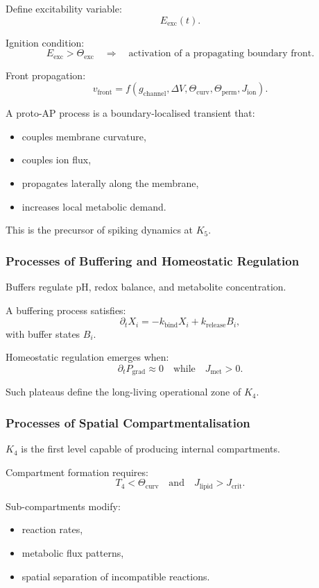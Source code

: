 Define excitability variable:
\[
E_{\text{exc}}(t).
\]

Ignition condition:
\[
E_{\text{exc}} > \Theta_{\text{exc}}
\quad\Rightarrow\quad
\text{activation of a propagating boundary front}.
\]

Front propagation:
\[
v_{\text{front}} = f(g_{\text{channel}}, \Delta V, \Theta_{\text{curv}},
\Theta_{\text{perm}}, J_{\text{ion}}).
\]

A proto-AP process is a boundary-localised transient that:
\begin{itemize}
    \item couples membrane curvature,
    \item couples ion flux,
    \item propagates laterally along the membrane,
    \item increases local metabolic demand.
\end{itemize}

This is the precursor of spiking dynamics at $K_5$.

\subsubsection{Processes of Buffering and Homeostatic Regulation}

Buffers regulate pH, redox balance, and metabolite concentration.

A buffering process satisfies:
\[
\partial_t X_i = -k_{\text{bind}} X_i + k_{\text{release}} B_i,
\]
with buffer states $B_i$.

Homeostatic regulation emerges when:
\[
\partial_t P_\text{grad} \approx 0
\quad\text{while}\quad
J_{\text{met}} > 0.
\]

Such plateaus define the long-living operational zone of $K_4$.

\subsubsection{Processes of Spatial Compartmentalisation}

$K_4$ is the first level capable of producing internal compartments.

Compartment formation requires:
\[
T_4 < \Theta_{\text{curv}} \quad\text{and}\quad
J_{\text{lipid}} > J_{\text{crit}}.
\]

Sub-compartments modify:
\begin{itemize}
    \item reaction rates,
    \item metabolic flux patterns,
    \item spatial separation of incompatible reactions.
\end{itemize}

